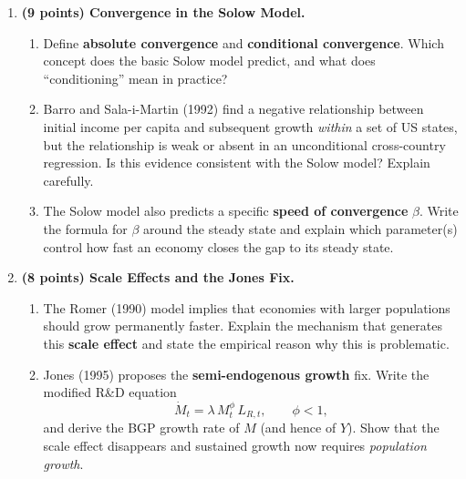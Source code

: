 \documentclass[a4paper,11pt]{article}
\begin{document}
\begin{enumerate}[label=\textbf{\arabic*.}, leftmargin=*, itemsep=14pt]

    \item \textbf{(9 points) Convergence in the Solow Model.}

    \begin{enumerate}[label=(\alph*), itemsep=6pt]
        \item Define \textbf{absolute convergence} and \textbf{conditional convergence}.
        Which concept does the basic Solow model predict, and what does ``conditioning''
        mean in practice?

        \item Barro and Sala-i-Martin (1992) find a negative relationship between initial
        income per capita and subsequent growth \emph{within} a set of US states, but the
        relationship is weak or absent in an unconditional cross-country regression.  Is this
        evidence consistent with the Solow model?  Explain carefully.

        \item The Solow model also predicts a specific \textbf{speed of convergence}
        $\beta$.  Write the formula for $\beta$ around the steady state and explain which
        parameter(s) control how fast an economy closes the gap to its steady state.
    \end{enumerate}

    \item \textbf{(8 points) Scale Effects and the Jones Fix.}

    \begin{enumerate}[label=(\alph*), itemsep=6pt]
        \item The Romer (1990) model implies that economies with larger populations should
        grow permanently faster.  Explain the mechanism that generates this \textbf{scale
        effect} and state the empirical reason why this is problematic.

        \item Jones (1995) proposes the \textbf{semi-endogenous growth} fix.  Write the
        modified R\&D equation
        \[
            \dot{M}_t = \lambda\,M_t^{\phi}\,L_{R,t}, \qquad \phi < 1,
        \]
        and derive the BGP growth rate of $M$ (and hence of $Y$).  Show that the scale
        effect disappears and sustained growth now requires \emph{population growth}.


\end{enumerate}
\end{enumerate}
\end{document}
